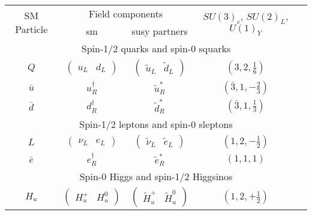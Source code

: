 \begin{table}[!htb]
	\centering
	\begin{tabular}{c|c|c|c|c}
		\hline
		\multirow{2}{*}{SM Particle}	& \multicolumn{2}{c|}{Field components}			& \multirow{2}{*}{$SU(3)_c$, $SU(2)_L$, $U(1)_Y$}		\\%
		\cline{2-3}
									& \Gls{sm} 										& \Gls{susy} partners												&												 \\
		\hline\hline
		\multicolumn{5}{c}{Spin-1/2 quarks and spin-0 squarks} \\
		\hline
		$Q$							& $\begin{pmatrix} u_L&d_L\end{pmatrix}$		& $\begin{pmatrix} \tilde{u}_L&\tilde{d}_L\end{pmatrix}$			& $(3, 2, \frac{1}{6})$			\\ %
		$\bar{u}$					& $u^{\dagger}_R$								& $\tilde{u}^*_R$													& $(\bar{3}, 1, -\frac{2}{3})$	& \\
		$\bar{d}$					& $d^{\dagger}_R$								& $\tilde{d}^*_R$													& $(\bar{3}, 1, \frac{1}{3})$	& \\
		\hline\hline
		\multicolumn{5}{c}{Spin-1/2 leptons and spin-0 sleptons} \\
		\hline
		$L$							& $\begin{pmatrix} \nu_L&e_L\end{pmatrix}$		& $\begin{pmatrix} \tilde{\nu}_L&\tilde{e}_L\end{pmatrix}$			& $(1, 2,-\frac{1}{2})$		\\	%
		$\bar{e}$					& $e^{\dagger}_R$								& $\tilde{e}^*_R$													& $(1, 1, 1)$					\\%
		\hline\hline
		\multicolumn{5}{c}{Spin-0 Higgs and spin-1/2 Higgsinos} \\
		\hline
		$H_u$						& $\begin{pmatrix} H_u^+&H_u^0\end{pmatrix}$	& $\begin{pmatrix} \widetilde{H}_u^+&\widetilde{H}_u^0\end{pmatrix}$& $(1, 2, +\frac{1}{2})$		\\%

\end{tabular}
\end{table}
